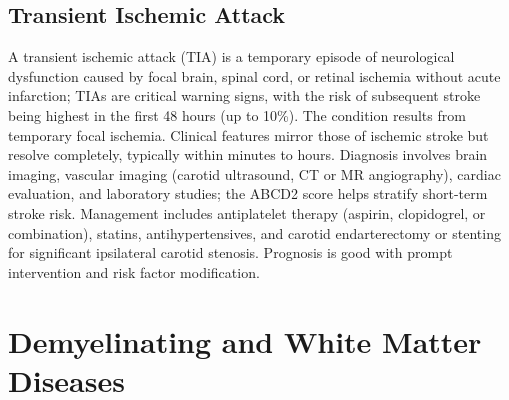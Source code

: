 \subsection{Transient Ischemic Attack}
\label{sec:Transient Ischemic Attack}
A transient ischemic attack (TIA) is a temporary episode of neurological dysfunction caused by focal brain, spinal cord, or retinal ischemia without acute infarction; TIAs are critical warning signs, with the risk of subsequent stroke being highest in the first 48 hours (up to 10\%). The condition results from temporary focal ischemia. Clinical features mirror those of ischemic stroke but resolve completely, typically within minutes to hours. Diagnosis involves brain imaging, vascular imaging (carotid ultrasound, CT or MR angiography), cardiac evaluation, and laboratory studies; the ABCD2 score helps stratify short-term stroke risk. Management includes antiplatelet therapy (aspirin, clopidogrel, or combination), statins, antihypertensives, and carotid endarterectomy or stenting for significant ipsilateral carotid stenosis. Prognosis is good with prompt intervention and risk factor modification.

\section{Demyelinating and White Matter Diseases}








\label{sec:Demyelinating and White Matter Diseases}

